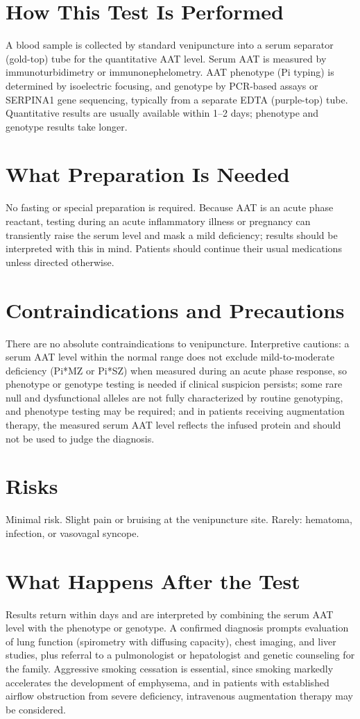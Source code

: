 \section*{How This Test Is Performed}
A blood sample is collected by standard venipuncture into a serum separator (gold-top) tube for the quantitative AAT level. Serum AAT is measured by immunoturbidimetry or immunonephelometry. AAT phenotype (Pi typing) is determined by isoelectric focusing, and genotype by PCR-based assays or SERPINA1 gene sequencing, typically from a separate EDTA (purple-top) tube. Quantitative results are usually available within 1--2 days; phenotype and genotype results take longer.
\section*{What Preparation Is Needed}
No fasting or special preparation is required. Because AAT is an acute phase reactant, testing during an acute inflammatory illness or pregnancy can transiently raise the serum level and mask a mild deficiency; results should be interpreted with this in mind. Patients should continue their usual medications unless directed otherwise.
\section*{Contraindications and Precautions}
There are no absolute contraindications to venipuncture. Interpretive cautions: a serum AAT level within the normal range does not exclude mild-to-moderate deficiency (Pi*MZ or Pi*SZ) when measured during an acute phase response, so phenotype or genotype testing is needed if clinical suspicion persists; some rare null and dysfunctional alleles are not fully characterized by routine genotyping, and phenotype testing may be required; and in patients receiving augmentation therapy, the measured serum AAT level reflects the infused protein and should not be used to judge the diagnosis.
\section*{Risks}
Minimal risk. Slight pain or bruising at the venipuncture site. Rarely: hematoma, infection, or vasovagal syncope.
\section*{What Happens After the Test}
Results return within days and are interpreted by combining the serum AAT level with the phenotype or genotype. A confirmed diagnosis prompts evaluation of lung function (spirometry with diffusing capacity), chest imaging, and liver studies, plus referral to a pulmonologist or hepatologist and genetic counseling for the family. Aggressive smoking cessation is essential, since smoking markedly accelerates the development of emphysema, and in patients with established airflow obstruction from severe deficiency, intravenous augmentation therapy may be considered.

